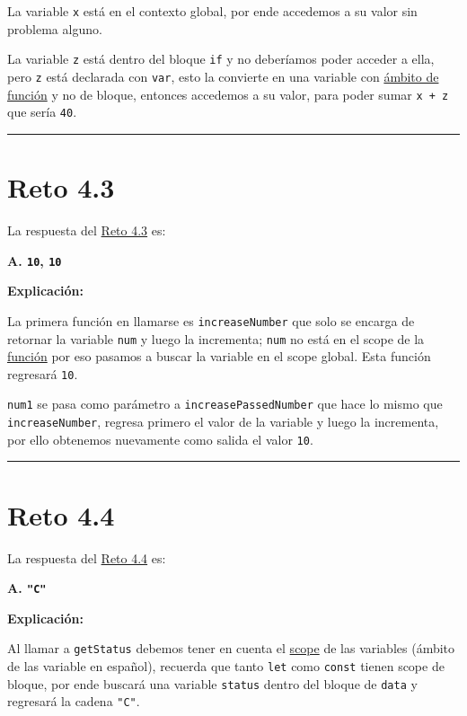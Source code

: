 \documentclass[
  letterpaper,
  DIV=11,
  numbers=noendperiod]{scrreprt}
\begin{document}
La variable \texttt{x} está en el contexto global, por ende accedemos a
su valor sin problema alguno.

La variable \texttt{z} está dentro del bloque \texttt{if} y no
deberíamos poder acceder a ella, pero \texttt{z} está declarada con
\texttt{var}, esto la convierte en una variable con
\hyperref[glos-ambito_de_funcion]{ámbito de función} y no de bloque,
entonces accedemos a su valor, para poder sumar \texttt{x\ +\ z} que
sería \texttt{40}.

\begin{center}\rule{0.5\linewidth}{0.5pt}\end{center}

\section{Reto 4.3}\label{sec-sol-cap4-reto3}

La respuesta del \hyperref[sec-cap4-reto3]{Reto 4.3} es:

\textbf{A. \texttt{10}, \texttt{10}}

\textbf{Explicación:}

La primera función en llamarse es \texttt{increaseNumber} que solo se
encarga de retornar la variable \texttt{num} y luego la incrementa;
\texttt{num} no está en el scope de la \hyperref[glos-funcion]{función}
por eso pasamos a buscar la variable en el scope global. Esta función
regresará \texttt{10}.

\texttt{num1} se pasa como parámetro a \texttt{increasePassedNumber} que
hace lo mismo que \texttt{increaseNumber}, regresa primero el valor de
la variable y luego la incrementa, por ello obtenemos nuevamente como
salida el valor \texttt{10}.

\begin{center}\rule{0.5\linewidth}{0.5pt}\end{center}

\section{Reto 4.4}\label{sec-sol-cap4-reto4}

La respuesta del \hyperref[sec-cap4-reto4]{Reto 4.4} es:

\textbf{A. \texttt{"C"}}

\textbf{Explicación:}

Al llamar a \texttt{getStatus} debemos tener en cuenta el
\hyperref[glos-scope]{scope} de las variables (ámbito de las variable en
español), recuerda que tanto \texttt{let} como \texttt{const} tienen
scope de bloque, por ende buscará una variable \texttt{status} dentro
del bloque de \texttt{data} y regresará la cadena \texttt{"C"}.
\end{document}
